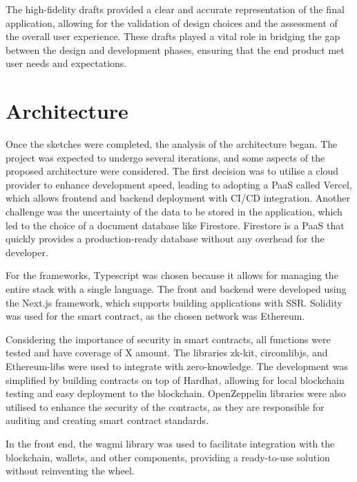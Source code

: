The high-fidelity drafts provided a clear and accurate representation of the final application, allowing for the validation of design choices and the assessment of the overall user experience. These drafts played a vital role in bridging the gap between the design and development phases, ensuring that the end product met user needs and expectations.

\section{Architecture}
Once the sketches were completed, the analysis of the architecture began. The project was expected to undergo several iterations, and some aspects of the proposed architecture were considered. The first decision was to utilise a cloud provider to enhance development speed, leading to adopting a PaaS called Vercel, which allows frontend and backend deployment with CI/CD integration. Another challenge was the uncertainty of the data to be stored in the application, which led to the choice of a document database like Firestore. Firestore is a PaaS that quickly provides a production-ready database without any overhead for the developer.

For the frameworks, Typescript was chosen because it allows for managing the entire stack with a single language. The front and backend were developed using the Next.js framework, which supports building applications with SSR. Solidity was used for the smart contract, as the chosen network was Ethereum.

Considering the importance of security in smart contracts, all functions were tested and have coverage of X amount. The libraries zk-kit, circomlibjs, and Ethereum-libs were used to integrate with zero-knowledge. The development was simplified by building contracts on top of Hardhat, allowing for local blockchain testing and easy deployment to the blockchain. OpenZeppelin libraries were also utilised to enhance the security of the contracts, as they are responsible for auditing and creating smart contract standards.

In the front end, the wagmi library was used to facilitate integration with the blockchain, wallets, and other components, providing a ready-to-use solution without reinventing the wheel.

